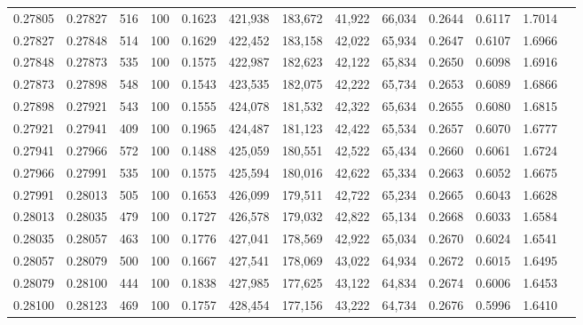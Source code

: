 \begin{tabular}{rrrrrrrrrrrrr}
0.27805 & 0.27827 &   516 & 100 &                                     0.1623 & 421,938 & 183,672 &  41,922 &  66,034 & 0.2644 & 0.6117 & 1.7014 \\
0.27827 & 0.27848 &   514 & 100 &                                     0.1629 & 422,452 & 183,158 &  42,022 &  65,934 & 0.2647 & 0.6107 & 1.6966 \\
0.27848 & 0.27873 &   535 & 100 &                                     0.1575 & 422,987 & 182,623 &  42,122 &  65,834 & 0.2650 & 0.6098 & 1.6916 \\
0.27873 & 0.27898 &   548 & 100 &                                     0.1543 & 423,535 & 182,075 &  42,222 &  65,734 & 0.2653 & 0.6089 & 1.6866 \\
0.27898 & 0.27921 &   543 & 100 &                                     0.1555 & 424,078 & 181,532 &  42,322 &  65,634 & 0.2655 & 0.6080 & 1.6815 \\
0.27921 & 0.27941 &   409 & 100 &                                     0.1965 & 424,487 & 181,123 &  42,422 &  65,534 & 0.2657 & 0.6070 & 1.6777 \\
0.27941 & 0.27966 &   572 & 100 &                                     0.1488 & 425,059 & 180,551 &  42,522 &  65,434 & 0.2660 & 0.6061 & 1.6724 \\
0.27966 & 0.27991 &   535 & 100 &                                     0.1575 & 425,594 & 180,016 &  42,622 &  65,334 & 0.2663 & 0.6052 & 1.6675 \\
0.27991 & 0.28013 &   505 & 100 &                                     0.1653 & 426,099 & 179,511 &  42,722 &  65,234 & 0.2665 & 0.6043 & 1.6628 \\
0.28013 & 0.28035 &   479 & 100 &                                     0.1727 & 426,578 & 179,032 &  42,822 &  65,134 & 0.2668 & 0.6033 & 1.6584 \\
0.28035 & 0.28057 &   463 & 100 &                                     0.1776 & 427,041 & 178,569 &  42,922 &  65,034 & 0.2670 & 0.6024 & 1.6541 \\
0.28057 & 0.28079 &   500 & 100 &                                     0.1667 & 427,541 & 178,069 &  43,022 &  64,934 & 0.2672 & 0.6015 & 1.6495 \\
0.28079 & 0.28100 &   444 & 100 &                                     0.1838 & 427,985 & 177,625 &  43,122 &  64,834 & 0.2674 & 0.6006 & 1.6453 \\
0.28100 & 0.28123 &   469 & 100 &                                     0.1757 & 428,454 & 177,156 &  43,222 &  64,734 & 0.2676 & 0.5996 & 1.6410 \\

\end{tabular}
